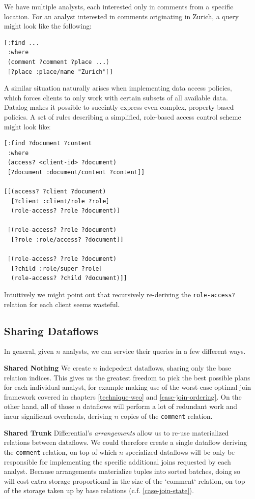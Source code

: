 \documentclass[../catalog.tex]{subfiles}
\begin{document}
We have multiple analysts, each interested only in comments from a
specific location. For an analyst interested in comments originating
in Zurich, a query might look like the following:

\begin{verbatim}
[:find ...
 :where
 (comment ?comment ?place ...)
 [?place :place/name "Zurich"]]
\end{verbatim}

A similar situation naturally arises when implementing data access
policies, which forces clients to only work with certain subsets of
all available data. Datalog makes it possible to succintly express
even complex, property-based policies. A set of rules describing a
simplified, role-based access control scheme might look like:

\begin{verbatim}
[:find ?document ?content
 :where
 (access? <client-id> ?document)
 [?document :document/content ?content]]

[[(access? ?client ?document)
  [?client :client/role ?role]
  (role-access? ?role ?document)]

 [(role-access? ?role ?document)
  [?role :role/access? ?document]]
 
 [(role-access? ?role ?document)
  [?child :role/super ?role]
  (role-access? ?child ?document)]]
\end{verbatim}

Intuitively we might point out that recursively re-deriving the
\texttt{role-access?} relation for each client seems wasteful.

\subsection{Sharing Dataflows}

In general, given $n$ analysts, we can service their queries in a few
different ways.

\textbf{Shared Nothing} We create $n$ indepedent dataflows, sharing
only the base relation indices. This gives us the greatest freedom to
pick the best possible plans for each individual analyst, for example
making use of the worst-case optimal join framework covered in
chapters \ref{technique-wco} and \ref{case-join-ordering}. On the
other hand, all of those $n$ dataflows will perform a lot of redundant
work and incur significant overheads, deriving $n$ copies of the
\texttt{comment} relation.

\textbf{Shared Trunk} Differential's \emph{arrangements} allow us to
re-use materialized relations between dataflows. We could therefore
create a single dataflow deriving the \texttt{comment} relation, on
top of which $n$ specialized dataflows will be only be responsible for
implementing the specific additional joins requested by each
analyst. Because arrangements materialize tuples into sorted batches,
doing so will cost extra storage proportional in the size of the
`comment` relation, on top of the storage taken up by base relations
(c.f. \ref{case-join-state}).
\end{document}
